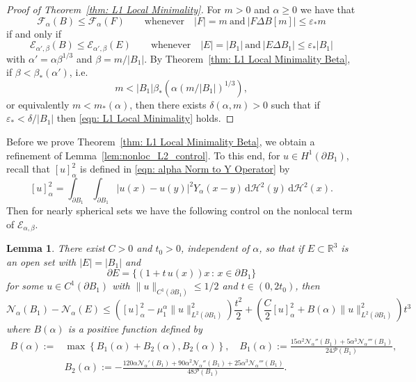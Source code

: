 \documentclass[a4paper,11pt,reqno]{amsart}
\numberwithin{equation}{section}
\newtheorem{lemma}[theorem]{Lemma}
\theoremstyle{remark}
\theoremstyle{definition}
\let\epsilon\varepsilon
\newcommand{\dd}{\,\mathrm{d}}
\newcommand{\ene}{\mathcal{E}_{\alpha,\beta}}
\newcommand{\nl}{\mathcal{N}_{\alpha}}
\renewcommand{\leq}{\leqslant}
\renewcommand{\geq}{\geqslant}
\newcommand{\calF}{\mathcal{F}}
\newcommand{\calE}{\mathcal{E}}
\newcommand{\Pe}{\mathcal{P}}
\begin{document}
\begin{proof}[Proof of Theorem~\ref{thm: L1 Local Minimality}] 
	For $m>0$ and $\alpha \geq 0$ we have that
	\[
		\calF_{\alpha}(B) \leq \calF_{\alpha}(F) \qquad \text{whenever} \quad |F|=m \ \text{and} \ |F\Delta B[m]|\leq \epsilon_*m
	\]
	if and only if
	\begin{equation}\label{eqn: L1 Local Minimality}
		\calE_{\alpha',\beta}(B) \leq \calE_{ \alpha', \beta}(E) \qquad \text{whenever} \quad |E|=|B_1| \ \text{and} \ |E\Delta B_1|\leq \epsilon_*|B_1|
	\end{equation}
	with $\alpha' = \alpha\beta^{1/3}$ and $\beta = m/|B_1|$. By Theorem~\ref{thm: L1 Local Minimality Beta}, if $\beta < \beta_*(\alpha')$, i.e.
	\[
		m < |B_1|\beta_*\left(\alpha(m/|B_1|)^{1/3}\right),
	\]
or equivalently $m<m_*(\alpha)$, then there exists $\delta(\alpha,m)>0$ such that if $\epsilon_*<\delta/|B_1|$ then \eqref{eqn: L1 Local Minimality} holds.  
\end{proof}

Before we prove Theorem~\ref{thm: L1 Local Minimality Beta}, we obtain a refinement of Lemma~\ref{lem:nonloc_L2_control}. To this end, for $u\in H^1(\partial B_1)$, recall that $[u]_{\alpha}^2$ is defined in \eqref{eqn: alpha Norm to Y Operator} by
	\[
		[u]_{\alpha}^2 = \int_{\partial B_1}\int_{\partial B_1} |u(x)-u(y)|^2 Y_{\alpha}(x-y) \dd\mathcal{H}^2(y)\dd\mathcal{H}^2(x).
	\]
Then for nearly spherical sets we have the following control on the nonlocal term of $\ene$.

	\begin{lemma}\label{lem: Fuglede Yukawa Potential} 
		There exist $C>0$ and $t_0>0$, independent of $\alpha$, so that if $E\subset \mathbb{R}^3$ is an open set with $|E|=|B_1|$ and 
	\[
		\partial E = \Big\lbrace(1+t\,u(x))x \, : \, x\in \partial B_1\Big\rbrace
	\]
for some $u\in C^1(\partial B_1)$ with $\|u\|_{C^1(\partial B_1)}\leq 1/2$ and $t\in (0,2t_0)$, then
	\[
		\nl(B_1)-\nl(E)\leq \left([u]_{\alpha}^2-\mu_1^{\alpha}\|u\|_{L^2(\partial B_1)}^2\right) \frac{t^2}{2}+\left(\frac{C}{2}[u]_{\alpha}^2+B(\alpha) \|u\|_{L^2(\partial B_1)}^2\right)t^3 
	\]
where $B(\alpha)$ is a  positive function defined by
	\begin{align*}
		B(\alpha):=&\max\left\lbrace B_1(\alpha)+B_2(\alpha),B_2(\alpha)\right\rbrace, \quad B_1(\alpha):=\frac{15\alpha^2\nl''(B_1)+5\alpha^3\nl'''(B_1)}{24\Pe(B_1)},\\
		&B_2(\alpha):=-\frac{120\alpha \nl'(B_1)+90\alpha^2 \nl''(B_1)+25\alpha^3\nl'''(B_1)}{48\Pe(B_1)}.
	\end{align*}
	\end{lemma}
	
\end{document}
